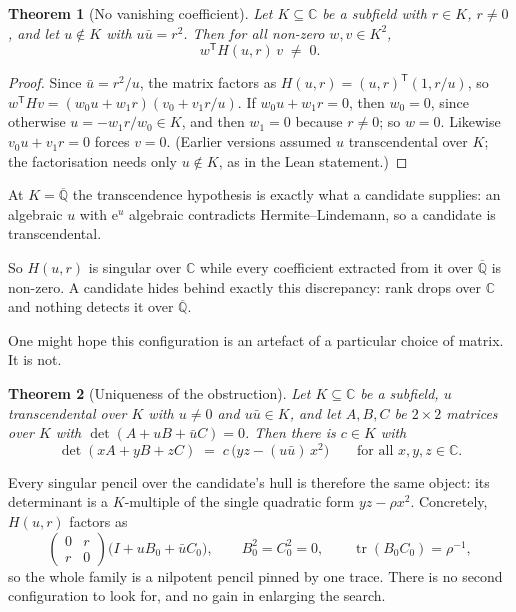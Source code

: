 \documentclass[11pt,a4paper]{article}
\theoremstyle{plain}
\newtheorem{theorem}{Theorem}[section]
\theoremstyle{definition}
\newcommand{\C}{\mathbb{C}}
\newcommand{\e}{\mathrm{e}}
\newcommand{\Alg}{\overline{\mathbb{Q}}}
\begin{document}
\begin{theorem}[No vanishing coefficient]\label{thm:novan}
Let $K\subseteq\C$ be a subfield with $r\in K$, $r\neq0$, and let $u\notin K$ with
$u\bar u=r^{2}$. Then for all non-zero $w,v\in K^{2}$,
\[
  w^{\mathsf T}H(u,r)\,v \;\neq\; 0 .
\]
\end{theorem}

\begin{proof}
Since $\bar u=r^{2}/u$, the matrix factors as $H(u,r)=(u,r)^{\mathsf T}(1,r/u)$, so
$w^{\mathsf T}Hv=(w_{0}u+w_{1}r)(v_{0}+v_{1}r/u)$. If $w_{0}u+w_{1}r=0$, then $w_{0}=0$, since otherwise
$u=-w_{1}r/w_{0}\in K$, and then $w_{1}=0$ because $r\neq0$; so $w=0$. Likewise $v_{0}u+v_{1}r=0$ forces
$v=0$. (Earlier versions assumed $u$ transcendental over $K$; the factorisation needs only $u\notin K$, as in
the Lean statement.)
\end{proof}

At $K=\Alg$ the transcendence hypothesis is exactly what a candidate supplies: an algebraic $u$
with $\e^{u}$ algebraic contradicts Hermite--Lindemann, so a candidate is transcendental.

So $H(u,r)$ is singular over $\C$ while every coefficient extracted from it over $\Alg$ is
non-zero. A candidate hides behind exactly this discrepancy: rank drops over $\C$ and nothing
detects it over $\Alg$.

One might hope this configuration is an artefact of a particular choice of matrix. It is not.

\begin{theorem}[Uniqueness of the obstruction]\label{thm:pencil}
Let $K\subseteq\C$ be a subfield, $u$ transcendental over $K$ with $u\neq0$ and $u\bar u\in K$,
and let $A,B,C$ be $2\times2$ matrices over $K$ with $\det(A+uB+\bar uC)=0$. Then there is
$c\in K$ with
\[
  \det(xA+yB+zC)\;=\;c\,\bigl(yz-(u\bar u)\,x^{2}\bigr)
  \qquad\text{for all }x,y,z\in\C .
\]
\end{theorem}

Every singular pencil over the candidate's hull is therefore the same object: its determinant is
a $K$-multiple of the single quadratic form $yz-\rho x^{2}$. Concretely, $H(u,r)$ factors as
\[
  \begin{pmatrix}0&r\\ r&0\end{pmatrix}
  \bigl(I+uB_{0}+\bar uC_{0}\bigr),\qquad
  B_{0}^{2}=C_{0}^{2}=0,\qquad \operatorname{tr}(B_{0}C_{0})=\rho^{-1},
\]
so the whole family is a nilpotent pencil pinned by one trace. There is no second configuration
to look for, and no gain in enlarging the search.
\end{document}
